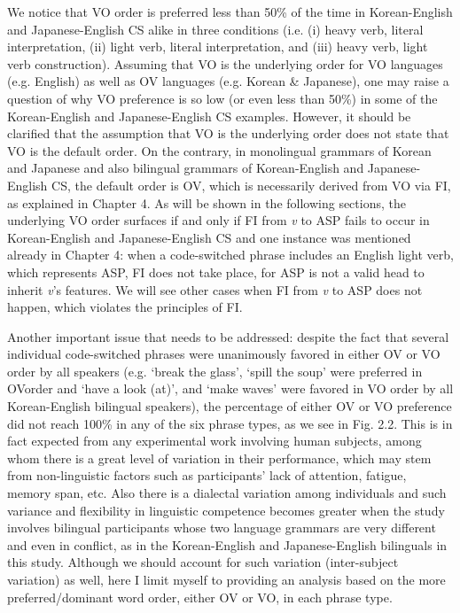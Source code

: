 We notice that \ac{VO} order is preferred less than 50\% of the time in Korean-English and Japanese-English \ac{CS} alike in three conditions (i.e. (i) heavy verb, literal interpretation, (ii) light verb, literal interpretation, and (iii) heavy verb, light verb construction). Assuming that \ac{VO} is the underlying order for \ac{VO} languages (e.g. English) as well as \ac{OV} languages (e.g. Korean \& Japanese), one may raise a question of why \ac{VO} preference is so low (or even less than 50\%) in some of the Korean-English and Japanese-English \ac{CS} examples. However, it should be clarified that the assumption that \ac{VO} is the underlying order does not state that \ac{VO} is the default order. On the contrary, in monolingual grammars of Korean and Japanese and also bilingual grammars of Korean-English and Japanese-English \ac{CS}, the default order is \ac{OV}, which is necessarily derived from \ac{VO} via \ac{FI}, as explained in Chapter 4. As will be shown in the following sections, the underlying \ac{VO} order surfaces if and only if \ac{FI} from \textit{v} to \ac{ASP} fails to occur in Korean-English and Japanese-English \ac{CS} and one instance was mentioned already in Chapter 4: when a code-switched phrase includes an English light verb, which represents \ac{ASP}, \ac{FI} does not take place, for \ac{ASP} is not a valid head to inherit \textit{v}’s features. We will see other cases when \ac{FI} from \textit{v} to \ac{ASP} does not happen, which violates the principles of \ac{FI}.

Another important issue that needs to be addressed: despite the fact that several individual code-switched phrases were unanimously favored in either \ac{OV} or \ac{VO} order by all speakers (e.g. ‘break the glass’, ‘spill the soup’ were preferred in \ac{OV}order and ‘have a look (at)’, and ‘make waves’ were favored in \ac{VO} order by all Korean-English bilingual speakers), the percentage of either \ac{OV} or \ac{VO} preference did not reach 100\% in any of the six phrase types, as we see in Fig. 2.2. This is in fact expected from any experimental work involving human subjects, among whom there is a great level of variation in their performance, which may stem from non-linguistic factors such as participants’ lack of attention, fatigue, memory span, etc. Also there is a dialectal variation among individuals and such variance and flexibility in linguistic competence becomes greater when the study involves bilingual participants whose two language grammars are very different and even in conflict, as in the Korean-English and Japanese-English bilinguals in this study. Although we should account for such variation (inter-subject variation) as well, here I limit myself to providing an analysis based on the more preferred/dominant word order, either \ac{OV} or \ac{VO}, in each phrase type. 

